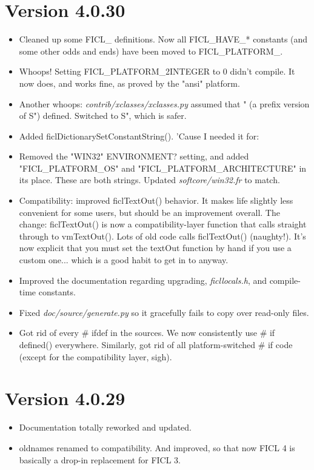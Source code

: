 \section*{Version 4.0.30}
\begin{itemize}[noitemsep]
	\item Cleaned up some FICL\_ definitions. Now all FICL\_HAVE\_*
	constants (and some other odds and ends) have been
	moved to FICL\_PLATFORM\_.

	\item Whoops! Setting FICL\_PLATFORM\_2INTEGER to 0 didn't compile.
	It now does, and works fine, as proved by the "ansi" platform.

	\item Another whoops: \textit{contrib/xclasses/xclasses.py}
	assumed that " (a prefix version of S") defined. Switched to S",
	which is safer.

	\item Added ficlDictionarySetConstantString(). 'Cause I needed
	it for:

	\item Removed the "WIN32" ENVIRONMENT? setting, and added
	"FICL\_PLATFORM\_OS" and "FICL\_PLATFORM\_ARCHITECTURE" in its
	place. These are both strings. Updated
	\textit{softcore/win32.fr} to match.

	\item Compatibility: improved ficlTextOut() behavior. It makes
	life slightly less convenient for some users, but should be an
	improvement overall. The change: ficlTextOut() is now a
	compatibility-layer function that calls straight through to
	vmTextOut(). Lots of old code calls ficlTextOut() (naughty!).
	It's now explicit that you must set the textOut function by hand
	if you use a custom one... which is a good habit to get in to
	anyway.

	\item Improved the documentation regarding upgrading,
	\textit{ficllocals.h}, and compile-time constants.

	\item Fixed \textit{doc/source/generate.py} so it gracefully
	fails to copy over read-only files.

	\item Got rid of every \# ifdef in the sources. We now
	consistently use \# if defined() everywhere. Similarly, got rid
	of all platform-switched \# if code (except for the
	compatibility layer, sigh).
\end{itemize}


\section*{Version 4.0.29}
\begin{itemize}[noitemsep]
	\item Documentation totally reworked and updated.

	\item oldnames renamed to compatibility. And improved, so that
	now FICL 4 is basically a drop-in replacement for FICL 3.
\end{itemize}


